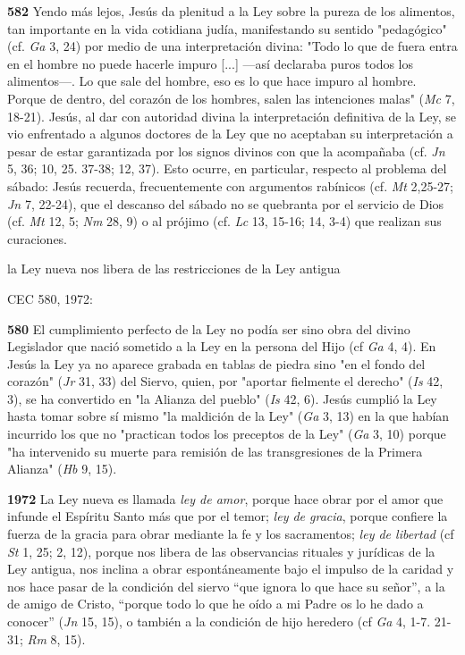 \documentclass[]{article}
\begin{document}
\textbf{582} Yendo más lejos, Jesús da plenitud a la Ley sobre la pureza
de los alimentos, tan importante en la vida cotidiana judía,
manifestando su sentido "pedagógico" (cf. \emph{Ga} 3, 24) por medio de
una interpretación divina: "Todo lo que de fuera entra en el hombre no
puede hacerle impuro {[}...{]} ---así declaraba puros todos los
alimentos---. Lo que sale del hombre, eso es lo que hace impuro al
hombre. Porque de dentro, del corazón de los hombres, salen las
intenciones malas" (\emph{Mc} 7, 18-21). Jesús, al dar con autoridad
divina la interpretación definitiva de la Ley, se vio enfrentado a
algunos doctores de la Ley que no aceptaban su interpretación a pesar de
estar garantizada por los signos divinos con que la acompañaba (cf.
\emph{Jn} 5, 36; 10, 25. 37-38; 12, 37). Esto ocurre, en particular,
respecto al problema del sábado: Jesús recuerda, frecuentemente con
argumentos rabínicos (cf. \emph{Mt} 2,25-27; \emph{Jn} 7, 22-24), que el
descanso del sábado no se quebranta por el servicio de Dios (cf.
\emph{Mt} 12, 5; \emph{Nm} 28, 9) o al prójimo (cf. \emph{Lc} 13, 15-16;
14, 3-4) que realizan sus curaciones.

la Ley nueva nos libera de las restricciones de la Ley antigua 

CEC 580, 1972:

\textbf{580} El cumplimiento perfecto de la Ley no podía ser sino obra
del divino Legislador que nació sometido a la Ley en la persona del Hijo
(cf \emph{Ga} 4, 4). En Jesús la Ley ya no aparece grabada en tablas de
piedra sino "en el fondo del corazón" (\emph{Jr} 31, 33) del Siervo,
quien, por "aportar fielmente el derecho" (\emph{Is} 42, 3), se ha
convertido en "la Alianza del pueblo" (\emph{Is} 42, 6). Jesús cumplió
la Ley hasta tomar sobre sí mismo "la maldición de la Ley" (\emph{Ga} 3,
13) en la que habían incurrido los que no "practican todos los preceptos
de la Ley" (\emph{Ga} 3, 10) porque "ha intervenido su muerte para
remisión de las transgresiones de la Primera Alianza" (\emph{Hb} 9, 15).

\textbf{1972} La Ley nueva es llamada \emph{ley de amor}, porque hace
obrar por el amor que infunde el Espíritu Santo más que por el temor;
\emph{ley de gracia}, porque confiere la fuerza de la gracia para obrar
mediante la fe y los sacramentos; \emph{ley de libertad} (cf \emph{St}
1, 25; 2, 12), porque nos libera de las observancias rituales y
jurídicas de la Ley antigua, nos inclina a obrar espontáneamente bajo el
impulso de la caridad y nos hace pasar de la condición del siervo ``que
ignora lo que hace su señor'', a la de amigo de Cristo, ``porque todo lo
que he oído a mi Padre os lo he dado a conocer'' (\emph{Jn} 15, 15), o
también a la condición de hijo heredero (cf \emph{Ga} 4, 1-7. 21-31;
\emph{Rm} 8, 15).
\end{document}
